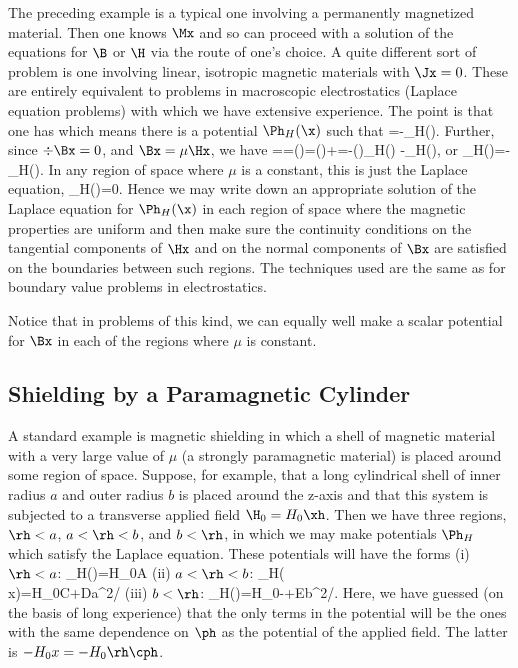 {The preceding example is a typical one involving a permanently magnetized
material. Then one knows $\Mx$ and so can proceed with a solution of the
equations for $\B$ or $\H$ via the route of one's choice. A quite different
sort of problem is one involving linear, isotropic magnetic materials with
$\Jx=0$. These are entirely equivalent to problems in macroscopic
electrostatics (Laplace equation problems) with which we have extensive
experience. The point is that one has
\beq
\curl{}
\eeq
 which means there is a potential $\Ph_H(\x)$ such that
\beq
\Hx=-\grad\Ph_H(\x).
\eeq
Further, since $\div\Bx=0$, and $\Bx=\mu\Hx$, we have
=\div\Bx=\div(\mu\Hx)=(\grad\mu)\Hx+\mu\div\Hx=-(\grad\mu)\grad\Ph_H(\x)
-\mu\lap\Ph_H(\x),
\eeq
or
\beq
\lap\Ph_H(\x)=-\frac{\grad\mu}{\mu}\grad\Ph_H(\x).
\eeq
In any region of space where $\mu$ is a constant, this is just the Laplace
equation,
\beq
\lap\Ph_H(\x)=0.
\eeq
Hence we may write down an appropriate solution of the Laplace equation for
$\Ph_H(\x)$ in each region of space where the magnetic properties are
uniform and then make sure the continuity conditions on the tangential
components of $\Hx$ and on the normal components of $\Bx$ are satisfied on
the boundaries between such regions. The techniques used are the same as
for boundary value problems in electrostatics.

Notice that in problems of this kind, we can equally well make a scalar
potential for $\Bx$ in each of the regions where $\mu$ is constant.

\subsection{Shielding by a Paramagnetic Cylinder}
A standard example is magnetic shielding in which a shell of magnetic
material with a very large value of $\mu$ (a strongly paramagnetic
material) is placed around some region of space. Suppose, for example, that
a long cylindrical shell of inner radius $a$ and outer radius $b$ is placed
around the z-axis and that this system is subjected to a transverse applied
field $\H_0=H_0\xh$. Then we have three regions, $\rh<a$, $a<\rh<b$, and
$b<\rh$, in which we may make potentials $\Ph_H$ which satisfy the Laplace
equation. These potentials will have the forms\newline
(i) $\rh<a$:
\beq
\Ph_H(\x)=H_0A\rh\cph
\eeq
(ii) $a<\rh<b$:
\beq
\Ph_H(\\x)=H_0\leb C\rh\cph+Da^2\cph/\rh\rib
\eeq
(iii) $b<\rh$:
\beq
\Ph_H(\x)=H_0\leb -\rh\cph+Eb^2\cph/\rh\rib.
\eeq
Here, we have guessed (on the basis of long experience) that the only terms
in the potential will be the ones with the same dependence on $\ph$ as the
potential of the applied field. The latter is $-H_0x=-H_0\rh\cph$.

}
